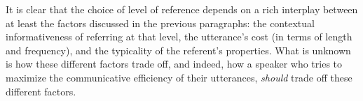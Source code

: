 \documentclass[10pt,letterpaper]{article}
\begin{document}



It is clear that the choice of level of reference depends on a rich interplay between at least the factors discussed in the previous paragraphs: the contextual informativeness of referring at that level, the utterance's cost (in terms of length and frequency), and the typicality of the referent's properties. What is unknown is how these different factors trade off, and indeed, how a speaker who tries to maximize the communicative efficiency of their utterances, \emph{should} trade off these different factors. 
\end{document}
